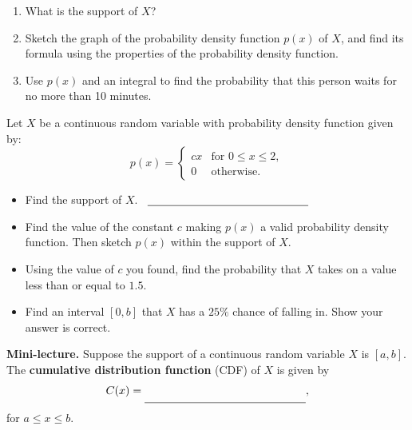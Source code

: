 \documentclass[10pt]{article}
\begin{document}
\begin{enumerate}[label=(\alph*)]
    \item What is the support of $X$?

    \vfill

    \newpage

    \item Sketch the graph of the probability density function $p(x)$ of $X$, and find its formula using the properties of the probability density function.

    \vfill

    \item Use $p(x)$ and an integral to find the probability that this person waits for no more than 10 minutes.

    \vfill
\end{enumerate}

Let $X$ be a continuous random variable with probability density function given by:
\[
p(x) = 
\begin{cases} 
cx & \text{for } 0 \leq x \leq 2, \\
0 & \text{otherwise}.
\end{cases}
\]
\begin{itemize}

\item[(a)] Find the support of $X$.
%
\,\hfill
{\large
$\rule[-2pt]{2in}{0.4pt}$
}
\hfill\,

\item[(b)] Find the value of the constant $c$ making $p(x)$ a valid probability density function. Then sketch $p(x)$ within the support of $X$.

\vfill

\item[(c)] Using the value of $c$ you found, find the probability that $X$ takes on a value less than or equal to $1.5$.

\vfill

\item[(d)] Find an interval $[0,b]$ that $X$ has a $25\%$ chance of falling in. Show your answer is correct.

\vfill

\end{itemize}

\newpage%

{\bf\color{blue}Mini-lecture.} Suppose the support of a continuous random variable $X$ is $[a, b]$. The {\bf cumulative distribution function} (CDF) of $X$ is given by
\[C(x) = \rule[-8pt]{2in}{0.4pt},\] for $a\le x\le b$.
\end{document}
